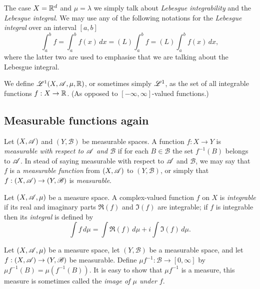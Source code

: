 \documentclass[12pt]{article}
\begin{document}
\begin{definition}
    The case $X=\mathbb{R}^d$ and $\mu=\lambda$ we simply talk about \textit{Lebesgue integrability} and the \textit{Lebesgue integral}. We may use any of the following notations for the \textit{Lebesgue integral} over an interval $[a,b]$
    \begin{equation*}
        \int_a^b f=\int_a^b f(x) \, dx=(L)\int_a^b f=(L)\int_a^b f(x) \, dx,
    \end{equation*}
    where the latter two are used to emphasise that we are talking about the Lebesgue integral.
\end{definition}
\begin{definition}[$\Lscr^1$]
    We define $\mathscr{L}^1(X,\mathscr{A},\mu,\mathbb{R})$, or sometimes simply $\Lscr^1$, as the set of all integrable functions $f:X\to \mathbb{R}$. (As opposed to $[-\infty,\infty]$-valued functions.)
\end{definition}
\subsection{Measurable functions again}
\begin{definition}
    Let $(X,\mathscr{A})$ and $(Y,\mathscr{B})$ be measurable spaces. A function $f:X\to Y$ is \textit{measurable with respect to $\mathscr{A}$ and $\mathscr{B}$} if for each $B\in \mathscr{B}$ the set $f^{-1}(B)$ belongs to $\mathscr{A}$. In stead of saying measurable with respect to $\mathscr{A}$ and $\mathscr{B}$, we may say that $f$ is a \textit{measurable function} from $(X,\mathscr{A})$ to $(Y,\mathscr{B})$, or simply that $f:(X,\mathscr{A})\to (Y,\mathscr{B})$ is \textit{measurable}.
\end{definition}
\begin{definition}
    Let $(X,\mathscr{A},\mu)$ be a measure space. A complex-valued function $f$ on $X$ is \textit{integrable} if its real and imaginary parts $\Re (f)$ and $\Im (f)$ are integrable; if $f$ is integrable then its \textit{integral} is defined by
    \begin{equation*}
        \int f \, d\mu = \int \Re(f) \, d\mu +i\int \Im(f) \, d\mu.
    \end{equation*}
\end{definition}
\begin{definition}[$\mu f^{-1}$]
    Let $(X,\mathscr{A},\mu)$ be a measure space, let $(Y,\mathscr{B})$ be a measurable space, and let $f:(X,\mathscr{A})\to(Y,\mathscr{B})$ be measurable. Define $\mu f^{-1}:\mathscr{B}\to [0,\infty]$ by $\mu f^{-1}(B)=\mu(f^{-1}(B))$. It is easy to show that $\mu f^{-1}$ is a measure, this measure is sometimes called the \textit{image of $\mu$ under $f$}.
\end{definition}
\newpage
\end{document}
